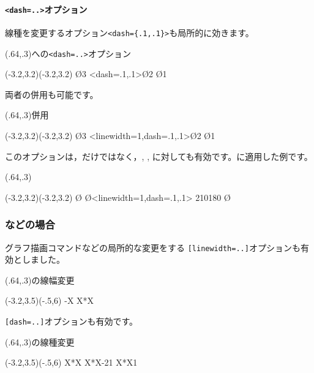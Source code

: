 \documentclass[a4j]{jarticle}
\begin{document}
\paragraph{\texttt{<dash=..>}オプション}
線種を変更するオプション\verb+<dash={.1,.1}>+も局所的に効きます。

\begin{showEx}(.64,.3){への\texttt{<dash=..>}オプション}
\begin{pszahyou*}[ul=4mm](-3.2,3.2)(-3.2,3.2)
  \En\O{3}
  \En<dash={.1,.1}>\O{2}
  \En\O{1}
\end{pszahyou*}
\end{showEx}

両者の併用も可能です。

\begin{showEx}(.64,.3){併用}
\begin{pszahyou*}[ul=4mm](-3.2,3.2)(-3.2,3.2)
  \En\O{3}
  \En<linewidth=1,dash={.1,.1}>\O{2}
  \En\O{1}
\end{pszahyou*}
\end{showEx}

このオプションは，だけではなく，, , 
に対しても有効です。に適用した例です。

\begin{showEx}(.64,.3){}
\begin{pszahyou*}[ul=4mm](-3.2,3.2)(-3.2,3.2)
  \Put\O{}
  \Put\O{\Daenko<linewidth=1,dash={.1,.1}>%
    {2}{1}{0}{180}}
  \Put\O{}
\end{pszahyou*}
\end{showEx}

\subsubsection{\texorpdfstring{}{YGurafu}などの場合}
グラフ描画コマンドなどの局所的な変更をする
\texttt{[linewidth=..]}オプションも有効としました。

\begin{showEx}(.64,.3){の線幅変更}
\begin{pszahyou}[ul=4mm](-3.2,3.5)(-.5,6)
  \def\Fx{X*X}
  \def\Gx{3-X}
  \YGurafu*[linewidth=1]\Gx
  \YGurafu*\Fx
\end{pszahyou}
\end{showEx}

\texttt{[dash=..]}オプションも有効です。

\begin{showEx}(.64,.3){の線種変更}
\begin{pszahyou}[ul=4mm](-3.2,3.5)(-.5,6)
  \def\Fx{X*X}
  \YGurafu[dash={.1,.1}]\Fx{}
  \YGurafu\Fx{-2}{1}
  \YGurafu[dash={.1,.1}]\Fx{1}\xmax
\end{pszahyou}
\end{showEx}
\end{document}
